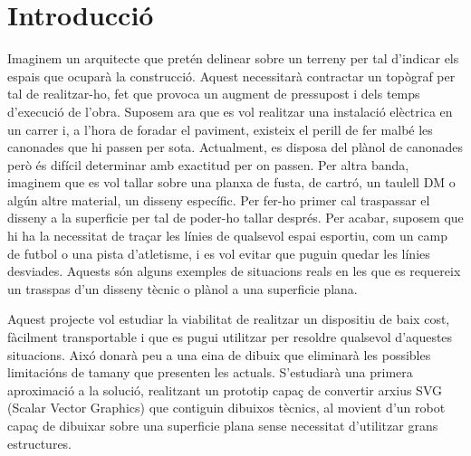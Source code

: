 \setlength\topmargin{8mm}
\onehalfspacing
\chapter{Introducció} %

\label{Chapter1} %



Imaginem un arquitecte que pretén delinear sobre un terreny per tal d'indicar els espais que ocuparà la construcció. Aquest necessitarà contractar un topògraf per tal de realitzar-ho, fet que provoca un augment de pressupost i dels temps d'execució de l'obra. Suposem ara que es vol realitzar una instalació elèctrica en un carrer i, a l'hora de foradar el paviment, existeix el perill de fer malbé les canonades que hi passen per sota. Actualment, es disposa del plànol de canonades però és difícil determinar amb exactitud per on passen. Per altra banda, imaginem que es vol tallar sobre una planxa de fusta, de cartró, un taulell DM o algún altre material, un disseny específic. Per fer-ho primer cal traspassar el disseny a la superficie per tal de poder-ho tallar després. Per acabar, suposem que hi ha la necessitat de traçar les línies de qualsevol espai esportiu, com un camp de futbol o una pista d'atletisme, i es vol evitar que puguin quedar les línies desviades. Aquests són alguns exemples de situacions reals en les que es requereix un trasspas d'un disseny tècnic o plànol a una superficie plana. 

Aquest projecte vol estudiar la viabilitat de realitzar un dispositiu de baix cost, fàcilment transportable i que es pugui utilitzar per resoldre qualsevol d'aquestes situacions. Aixó donarà peu a una eina de dibuix que eliminarà les possibles limitacións de tamany que presenten les actuals. S'estudiarà una primera aproximació a la solució, realitzant un prototip capaç de convertir arxius SVG (Scalar Vector Graphics) que contiguin dibuixos tècnics, al movient d'un robot capaç de dibuixar sobre una superficie plana sense necessitat d'utilitzar grans estructures. 

